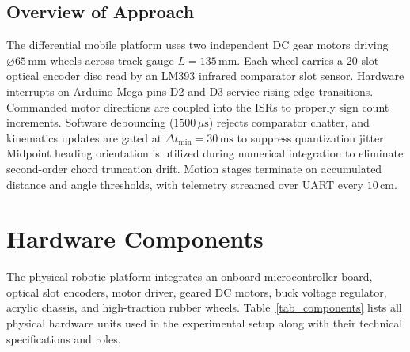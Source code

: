 \documentclass[11pt,a4paper]{article}
\begin{document}
\subsection{Overview of Approach}
The differential mobile platform uses two independent DC gear motors driving $\varnothing 65\,\text{mm}$ wheels across track gauge $L = 135\,\text{mm}$. Each wheel carries a 20-slot optical encoder disc read by an LM393 infrared comparator slot sensor. Hardware interrupts on Arduino Mega pins D2 and D3 service rising-edge transitions. Commanded motor directions are coupled into the ISRs to properly sign count increments. Software debouncing ($1500\,\mu\text{s}$) rejects comparator chatter, and kinematics updates are gated at $\Delta t_{\text{min}} = 30\,\text{ms}$ to suppress quantization jitter. Midpoint heading orientation is utilized during numerical integration to eliminate second-order chord truncation drift. Motion stages terminate on accumulated distance and angle thresholds, with telemetry streamed over UART every $10\,\text{cm}$.

\section{Hardware Components}
The physical robotic platform integrates an onboard microcontroller board, optical slot encoders, motor driver, geared DC motors, buck voltage regulator, acrylic chassis, and high-traction rubber wheels. Table~\ref{tab_components} lists all physical hardware units used in the experimental setup along with their technical specifications and roles.
\end{document}
